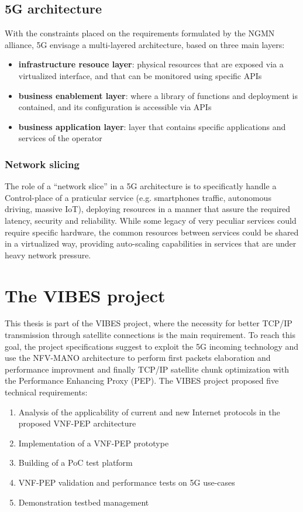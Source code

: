 \subsection{5G architecture}

With the constraints placed on the requirements formulated by the NGMN alliance,
5G envisage a multi-layered architecture, based on three main layers:
\begin{itemize}
\item \textbf{infrastructure resouce layer}: physical resources that are exposed
  via a virtualized interface, and that can be monitored using specific APIs
\item \textbf{business enablement layer}: where a library of functions and
  deployment is contained, and its configuration is accessible via APIs
\item \textbf{business application layer}: layer that contains specific
  applications and services of the operator
\end{itemize}


\subsubsection{Network slicing}
The role of a ``network slice'' in a 5G architecture is to specificatly handle a
Control-place of a praticular service (e.g. smartphones traffic, autonomous
driving, massive IoT), deploying resources in a manner that assure the required
latency, security and reliability. While some legacy of very peculiar services
could require specific hardware, the common resources between services could be
shared in a virtualized way, providing auto-scaling capabilities in services
that are under heavy network pressure.

\section{The VIBES project}
 
 This thesis is part of the VIBES project, where the necessity for better TCP/IP
 transmission through satellite connections is the main requirement. To reach
 this goal, the project specifications suggest to exploit the 5G incoming
 technology and use the NFV-MANO architecture to perform first packets
 elaboration and performance improvment and finally TCP/IP satellite chunk
 optimization with the Performance Enhancing Proxy (PEP). The VIBES project
 proposed five technical requirements:
\begin{enumerate}
 \item Analysis of the applicability of current and new Internet protocols in
   the proposed VNF-PEP architecture
 \item Implementation of a VNF-PEP prototype
 \item Building of a PoC test platform
 \item VNF-PEP validation and performance tests on 5G use-cases
 \item Demonstration testbed management
\end{enumerate}

